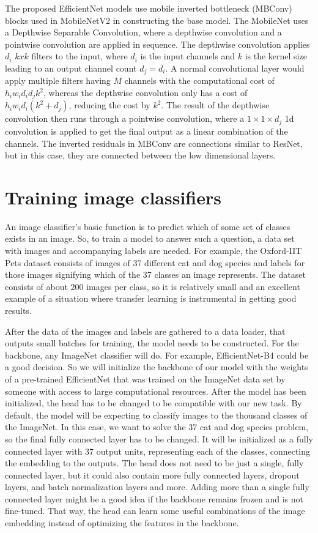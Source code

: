 The proposed EfficientNet models use mobile inverted bottleneck (MBConv) blocks used in MobileNetV2 \citep{mobileNetv2} in constructing the base model. The MobileNet uses a Depthwise Separable Convolution, where a depthwise convolution and a pointwise convolution are applied in sequence. The depthwise convolution applies ${d_i}$ ${k x k}$ filters to the input, where ${d_i}$ is the input channels and ${k}$ is the kernel size leading to an output channel count ${d_j = d_i}$. A normal convolutional layer would apply multiple filters having ${M}$ channels with the computational cost of ${h_i w_i d_i d_j k^2}$, whereas the depthwise convolution only has a cost of ${h_i w_i d_i (k^2 + d_j)}$, reducing the cost by ${k^2}$. The result of the depthwise convolution then runs through a pointwise convolution, where a ${1 \times 1 \times d_j}$ 1d convolution is applied to get the final output as a linear combination of the channels. The inverted residuals in MBConv are connections similar to ResNet, but in this case, they are connected between the low dimensional layers.

\section{Training image classifiers}
An image classifier's basic function is to predict which of some set of classes exists in an image.
So, to train a model to answer such a question, a data set with images and accompanying labels are needed.
For example, the Oxford-IIT Pets dataset \citep{catsdogs} consists of images of 37 different cat and dog species and labels for those images signifying which of the 37 classes an image represents.
The dataset consists of about 200 images per class, so it is relatively small and an excellent example of a situation where transfer learning is instrumental in getting good results.

After the data of the images and labels are gathered to a data loader, that outputs small batches for training, the model needs to be constructed.
For the backbone, any ImageNet classifier will do. 
For example, EfficientNet-B4 could be a good decision.
So we will initialize the backbone of our model with the weights of a pre-trained EfficientNet that was trained on the ImageNet data set by someone with access to large computational resources.
After the model has been initialized, the head has to be changed to be compatible with our new task.
By default, the model will be expecting to classify images to the thousand classes of the ImageNet.
In this case, we want to solve the 37 cat and dog species problem, so the final fully connected layer has to be changed.
It will be initialized as a fully connected layer with 37 output units, representing each of the classes, connecting the embedding to the outputs.
The head does not need to be just a single, fully connected layer, but it could also contain more fully connected layers, dropout layers, and batch normalization layers and more.
Adding more than a single fully connected layer might be a good idea if the backbone remains frozen and is not fine-tuned. 
That way, the head can learn some useful combinations of the image embedding instead of optimizing the features in the backbone.

